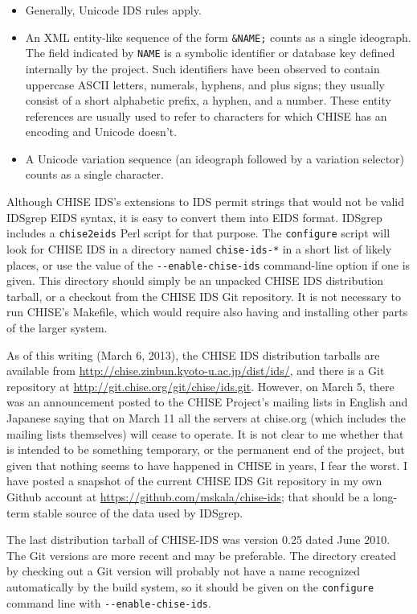 \documentclass[twocolumn]{report}
\begin{document}
\begin{itemize}
\item Generally, Unicode IDS rules apply.
\item An XML entity-like sequence of the form \texttt{\&NAME;} counts as a
single ideograph.  The field indicated by \texttt{NAME} is a symbolic
identifier or database key defined internally by the project.  Such
identifiers have been observed to contain uppercase ASCII letters, numerals,
hyphens, and plus signs; they usually consist of a short alphabetic
prefix, a hyphen, and a number.  These entity references are usually used to
refer to characters for which CHISE has an encoding and Unicode doesn't.
\item A Unicode variation sequence (an ideograph followed by a variation
selector) counts as a single character.
\end{itemize}

Although CHISE IDS's extensions to IDS permit strings that would not be
valid IDSgrep EIDS syntax, it is easy to convert them into EIDS format. 
IDSgrep includes a \texttt{chise2eids} Perl script for that purpose.  The
\texttt{configure} script will look for CHISE IDS in a directory named
\texttt{chise-ids-*} in a short list of likely places, or use the value of
the \texttt{-{}-enable-chise-ids} command-line option if one is given.  This
directory should simply be an unpacked CHISE IDS distribution tarball, or a
checkout from the CHISE IDS Git repository.  It is not necessary to run
CHISE's Makefile, which would require also having and installing other parts
of the larger system.

As of this writing (March 6, 2013), the CHISE IDS distribution tarballs are
available from \url{http://chise.zinbun.kyoto-u.ac.jp/dist/ids/}, and there
is a Git repository at \url{http://git.chise.org/git/chise/ids.git}. 
However, on March 5, there was an announcement posted to the CHISE Project's
mailing lists in English and Japanese saying that on March 11 all the
servers at chise.org (which includes the mailing lists themselves) will
cease to operate.  It is not clear to me whether that is intended to be
something temporary, or the permanent end of the project, but given that
nothing seems to have happened in CHISE in years, I fear the worst.  I have
posted a snapshot of the current CHISE IDS Git repository in my own Github
account at \url{https://github.com/mskala/chise-ids}; that should be a
long-term stable source of the data used by IDSgrep.

The last distribution tarball of CHISE-IDS was version 0.25 dated June 2010. 
The Git versions are more recent and may be preferable.  The directory
created by checking out a Git version will probably not have a name
recognized automatically by the build system, so it should be given on the
\texttt{configure} command line with \texttt{-{}-enable-chise-ids}.
\end{document}
